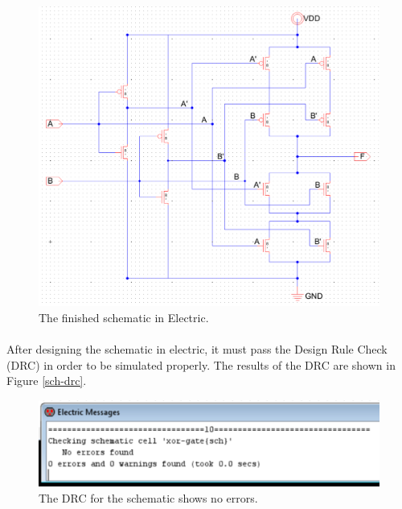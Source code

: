 \documentclass{article}
\begin{document}
  \begin{figure}[H]
    \centering
    \includegraphics[width=0.9\linewidth, frame]{screenshots/schematic.png}
    \caption{The finished schematic in Electric.}
    \label{fig:schem}
  \end{figure}

  \paragraph{}
  After designing the schematic in electric, it must pass the Design Rule Check (DRC) in order to be simulated properly. The results of the DRC are shown in Figure \ref{sch-drc}.

  \begin{figure}[H]
    \centering
    \includegraphics[width=0.9\linewidth, frame]{screenshots/schematic-drc.png}
    \caption{The DRC for the schematic shows no errors.}
    \label{fig:sch-drc}
  \end{figure}

\end{document}
